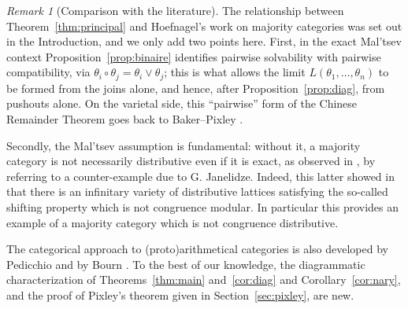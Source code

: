 \documentclass[11pt,a4paper]{article}
\theoremstyle{plain}
\theoremstyle{definition}
\theoremstyle{remark}
\newtheorem{remarque}[theoreme]{Remark}
\theoremstyle{plain}
\begin{document}
\begin{remarque}[Comparison with the literature]\label{rem:litterature}
The relationship between Theorem~\ref{thm:principal} and Hoefnagel's work
on majority categories \cite{Hoefnagel, Hoefnagel2, Hoefnagel3} was set out in the Introduction, and we
only add two points here. First, in the exact Mal'tsev context
Proposition~\ref{prop:binaire} identifies pairwise solvability with
pairwise compatibility, via $\theta_i \circ \theta_j = \theta_i \vee
\theta_j$; this is what allows the limit $L(\theta_1,\dots,\theta_n)$ to be
formed from the joins alone, and hence, after
Proposition~\ref{prop:diag}, from pushouts alone. 
On the varietal side, this “pairwise” form of the Chinese
Remainder Theorem goes back to Baker–Pixley \cite{BP}.

Secondly, the Mal'tsev
assumption is fundamental: without it, a majority category is not necessarily distributive even if it is exact, as observed in \cite{Hoefnagel}, by referring to a counter-example due to G. Janelidze. Indeed, this latter showed in \cite{GJanelidze} that there is 
an infinitary variety of distributive lattices satisfying the so-called shifting property \cite{BG} which is not congruence modular. In particular this provides an example of a majority category which is not congruence distributive. 


The
categorical approach to (proto)arithmetical categories is also developed by Pedicchio \cite{Pedicchio} and by Bourn \cite{Bourn, Bourn2}. 
To the
best of our knowledge, the diagrammatic characterization of
Theorems~\ref{thm:main} and~\ref{cor:diag} and Corollary~\ref{cor:nary}, and the proof of
Pixley's theorem given in Section~\ref{sec:pixley}, are new.
\end{remarque}
\end{document}
